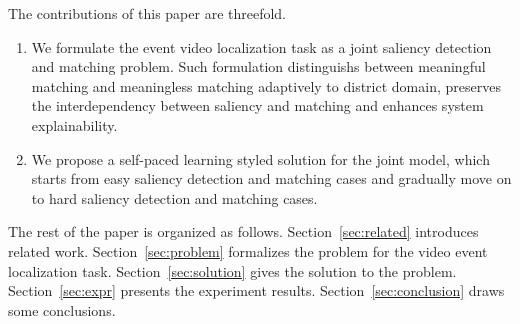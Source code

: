 

The contributions of this paper are threefold. 
\begin{enumerate}
\item We formulate the event video localization task as a joint saliency detection and matching problem. 
Such formulation distinguishs between meaningful matching and meaningless matching adaptively to district domain, preserves the interdependency between saliency and matching and enhances system explainability.  
\item We propose a self-paced learning styled solution for the joint model, which starts from easy saliency detection and matching cases and gradually move on to hard saliency detection and matching cases. 
\end{enumerate}

The rest of the paper is organized as follows. 
Section~\ref{sec:related} introduces related work. 
Section~\ref{sec:problem} formalizes the problem for the video event localization task. 
Section~\ref{sec:solution} gives the solution to the problem. 
Section~\ref{sec:expr} presents the experiment results. 
Section~\ref{sec:conclusion} draws some conclusions. 
